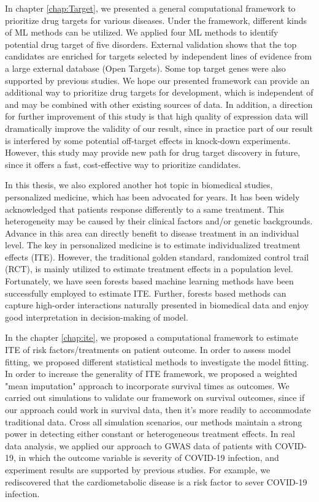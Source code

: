   In chapter \ref{chap:Target}, we presented a general computational framework to prioritize drug targets for various diseases. Under the framework, different kinds of ML methods can be utilized. We applied four ML methods to identify potential drug target of five disorders. External validation shows that the top candidates are enriched for targets selected by independent lines of evidence from a large external database (Open Targets). Some top target genes were also supported by previous studies. We hope our presented framework can provide an additional way to prioritize drug targets for development, which is independent of and may be combined with other existing sources of data. In addition, a direction for further improvement of this study is that high quality of expression data will dramatically improve the validity of our result, since in practice part of our result is interfered by some potential off-target effects in knock-down experiments. However, this study may provide new path for drug target discovery in future, since it offers a fast, cost-effective way to prioritize  candidates.

  In this thesis, we also explored another hot topic in biomedical studies, personalized medicine, which has been advocated for years. It has been widely acknowledged that patients response differently to a same treatment. This heterogeneity may be caused by their clinical factors and/or genetic backgrounds. Advance in this area can directly benefit to disease treatment in an individual level. The key in personalized medicine is to estimate individualized treatment effects (ITE). However, the traditional golden standard,  randomized control trail (RCT),  is mainly utilized to estimate treatment effects in a population level. Fortunately, we have seen forests based machine learning methods have been successfully employed to estimate ITE. Further, forests based methods can capture high-order interactions naturally presented in biomedical data and enjoy good interpretation in decision-making of model.

  In the chapter \ref{chap:ite}, we proposed a computational framework to estimate ITE of risk factors/treatments on patient outcome. In order to assess model fitting, we proposed different statistical methods to investigate the model fitting. In order to increase the generality of ITE framework, we proposed a weighted "mean imputation" approach to incorporate survival times as outcomes. We carried out simulations to validate our framework on survival outcomes, since if our approach could work in survival data, then it's more readily to accommodate traditional data. Cross all simulation scenarios, our methods maintain a strong power in detecting either constant or heterogeneous treatment effects. In real data analysis, we applied our approach to GWAS data of patients with COVID-19, in which the outcome variable is severity of COVID-19 infection, and experiment results are supported by previous studies. For example, we rediscovered that the cardiometabolic disease is a risk factor to sever COVID-19 infection.

